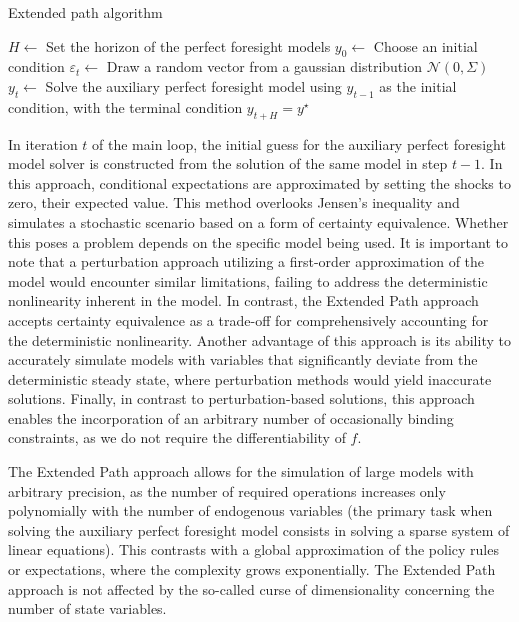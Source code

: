\documentclass[a4paper,12pt]{amsart}
\begin{document}
\begin{algorithm}[H]
   \caption{Extended path algorithm}
   \label{alg:ep}
   \begin{algorithmic}[1]
      \STATE $H \leftarrow$ Set the horizon of the perfect foresight models
      \STATE $y_0 \leftarrow$ Choose an initial condition
      \STATE $\varepsilon_t \leftarrow$ Draw a random vector from a gaussian distribution  $\mathcal N\left(0, \Sigma\right)$
      \STATE $y_t \leftarrow$ Solve the auxiliary perfect foresight model using \(y_{t-1}\) as the initial condition, with the terminal condition \(y_{t+H} = y^{\star}\)
      \ENDFOR
   \end{algorithmic}
\end{algorithm}

\smallskip\smallskip

In iteration \(t\) of the main loop, the initial guess for the
auxiliary perfect foresight model solver is constructed from the
solution of the same model in step \(t-1\). In this approach,
conditional expectations are approximated by setting the shocks to
zero, their expected value. This method overlooks Jensen's inequality
and simulates a stochastic scenario based on a form of certainty
equivalence. Whether this poses a problem depends on the specific
model being used. It is important to note that a perturbation approach
utilizing a first-order approximation of the model would encounter
similar limitations, failing to address the deterministic nonlinearity
inherent in the model. In contrast, the Extended Path approach accepts
certainty equivalence as a trade-off for comprehensively accounting
for the deterministic nonlinearity. Another advantage of this approach
is its ability to accurately simulate models with variables that
significantly deviate from the deterministic steady state, where
perturbation methods would yield inaccurate solutions. Finally, in
contrast to perturbation-based solutions, this approach enables the
incorporation of an arbitrary number of occasionally binding
constraints, as we do not require the differentiability
of \(f\).\newline

The Extended Path approach allows for the simulation of large models
with arbitrary precision, as the number of required operations
increases only polynomially with the number of endogenous variables
(the primary task when solving the auxiliary perfect foresight model
consists in solving a sparse system of linear equations). This
contrasts with a global approximation of the policy rules or
expectations, where the complexity grows exponentially. The Extended
Path approach is not affected by the so-called curse of dimensionality
concerning the number of state variables.\newline
\end{document}
